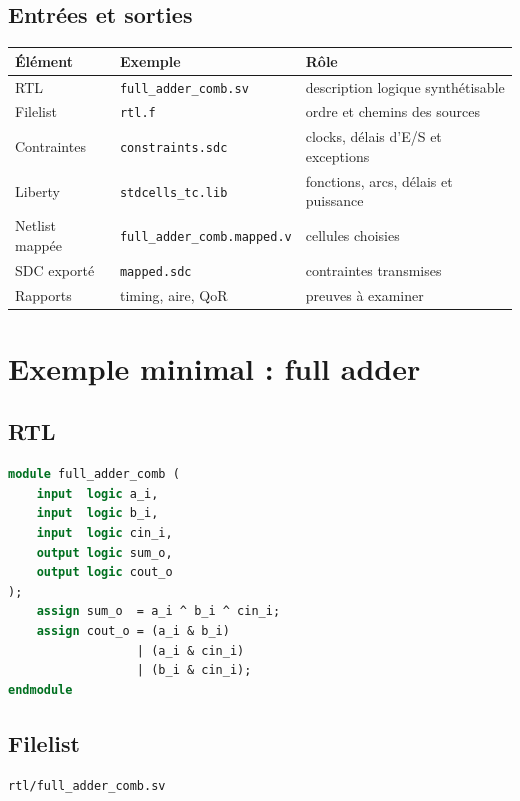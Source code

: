 \documentclass[11pt,a4paper,openany]{report}
\begin{document}
\section{Entrées et sorties}

\begin{longtable}{p{}p{}p{}}
\toprule
Élément & Exemple & Rôle \\
\midrule
RTL & \texttt{full\_adder\_comb.sv} & description logique synthétisable \\
Filelist & \texttt{rtl.f} & ordre et chemins des sources \\
Contraintes & \texttt{constraints.sdc} & clocks, délais d'E/S et exceptions \\
Liberty & \texttt{stdcells\_tc.lib} & fonctions, arcs, délais et puissance \\
Netlist mappée & \texttt{full\_adder\_comb.mapped.v} & cellules choisies \\
SDC exporté & \texttt{mapped.sdc} & contraintes transmises \\
Rapports & timing, aire, QoR & preuves à examiner \\
\bottomrule
\end{longtable}

\chapter{Exemple minimal : full adder}

\section{RTL}

\begin{lstlisting}[style=guidecode,language=SystemVerilog,
caption={rtl/full\_adder\_comb.sv}]
module full_adder_comb (
    input  logic a_i,
    input  logic b_i,
    input  logic cin_i,
    output logic sum_o,
    output logic cout_o
);
    assign sum_o  = a_i ^ b_i ^ cin_i;
    assign cout_o = (a_i & b_i)
                  | (a_i & cin_i)
                  | (b_i & cin_i);
endmodule
\end{lstlisting}

\section{Filelist}

\begin{lstlisting}[style=guidecode,caption={syn/rtl.f}]
rtl/full_adder_comb.sv
\end{lstlisting}
\end{document}
